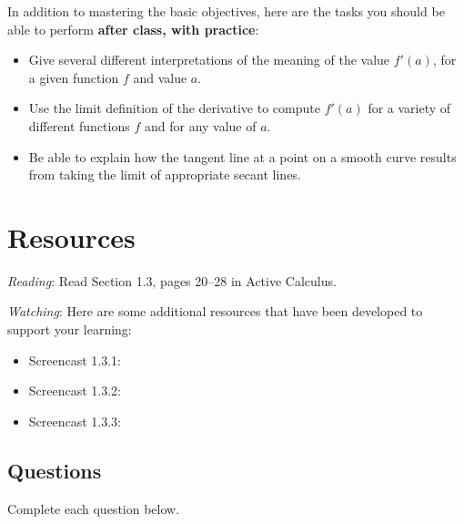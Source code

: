 \documentclass{ximera}
\begin{document}
In addition to mastering the basic objectives, here are the tasks you should be able to perform \textbf{after class, with practice}: 

\begin{itemize}
	\item Give several different interpretations of the meaning of the value $f'(a)$, for a given function $f$ and value $a$.
	\item Use the limit definition of the derivative to compute $f'(a)$ for a variety of different functions $f$ and for any value of $a$.
	\item Be able to explain how the tangent line at a point on a  smooth curve results from taking the limit of appropriate secant lines.
\end{itemize}

\section{Resources}

\noindent
\emph{Reading}: Read Section 1.3, pages 20--28 in Active Calculus.

\noindent
\emph{Watching}: Here are some additional resources that have been developed to support your learning: 

\begin{itemize}
	\item Screencast 1.3.1:  
	\item Screencast 1.3.2:  
	\item Screencast 1.3.3: 
\end{itemize}

\subsection*{Questions}

\noindent Complete each question below.  
\end{document}
